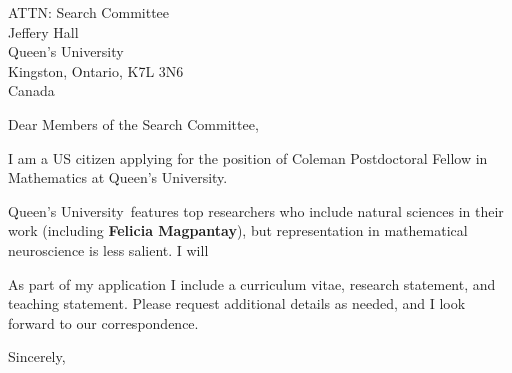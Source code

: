 \documentclass[11pt,a4paper]{letter}
\begin{document}

\def\School{Queen's University}
\begin{letter}
{ATTN: Search Committee\\
Jeffery Hall\\
Queen's University\\
Kingston, Ontario, K7L 3N6\\
Canada}


\opening{Dear Members of the Search Committee,}

I am a US citizen applying for the position of Coleman Postdoctoral Fellow in Mathematics at \School. 



\School~features top researchers who include natural sciences in their work (including \textbf{Felicia Magpantay}), but representation in mathematical neuroscience is less salient. I will 



As part of my application I include a curriculum vitae, research statement, and teaching statement. Please request additional details as needed, and I look forward to our correspondence.

\closing{Sincerely,}
\end{letter}
\end{document}
